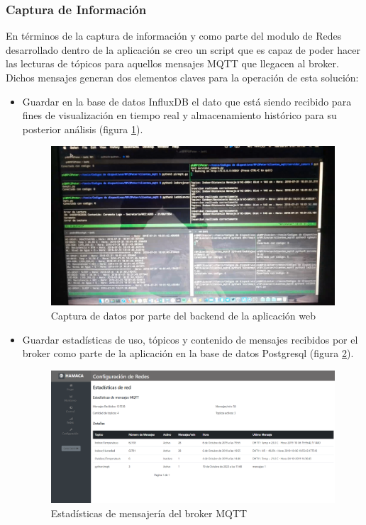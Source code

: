 \subsubsection{Captura de Información}
En términos de la captura de información y como parte del modulo de Redes desarrollado dentro de la aplicación se creo un script que es capaz de poder hacer las lecturas de tópicos para aquellos mensajes MQTT que llegacen al broker. Dichos mensajes generan dos elementos claves para la operación de esta solución:
\begin{itemize}
\item Guardar en la base de datos InfluxDB el dato que está siendo recibido para fines de visualización en tiempo real y almacenamiento histórico para su posterior análisis (figura \ref{fig:captura_data}).
\begin{figure}[htb]
\centering
\includegraphics[scale=0.18]{./Figuras/captura_data.png}
\caption{Captura de datos por parte del backend de la aplicación web}
\label{fig:captura_data}
\end{figure}

\item Guardar estadísticas de uso, tópicos y contenido de mensajes recibidos por el broker como parte de la aplicación en la base de datos Postgresql (figura \ref{fig:app_red}).
\begin{figure}[htb]
\centering
\includegraphics[scale=0.2]{./Figuras/hamaca_redes.png}
\caption{Estadísticas de mensajería del broker MQTT}
\label{fig:app_red}
\vspace*{-10pt}
\end{figure}
\end{itemize} 

